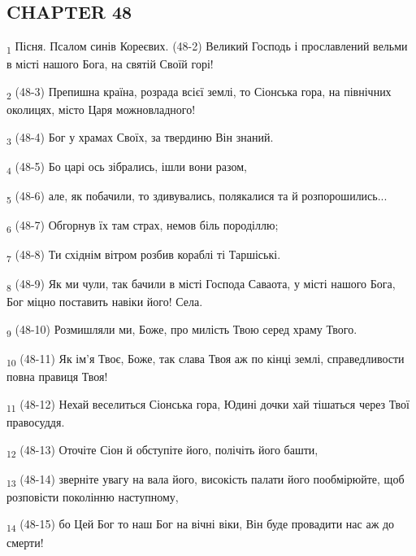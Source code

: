 \subsection{CHAPTER 48}
\begin{tcolorbox}
\textsubscript{1} Пісня. Псалом синів Кореєвих. (48-2) Великий Господь і прославлений вельми в місті нашого Бога, на святій Своїй горі!
\end{tcolorbox}
\begin{tcolorbox}
\textsubscript{2} (48-3) Препишна країна, розрада всієї землі, то Сіонська гора, на північних околицях, місто Царя можновладного!
\end{tcolorbox}
\begin{tcolorbox}
\textsubscript{3} (48-4) Бог у храмах Своїх, за твердиню Він знаний.
\end{tcolorbox}
\begin{tcolorbox}
\textsubscript{4} (48-5) Бо царі ось зібрались, ішли вони разом,
\end{tcolorbox}
\begin{tcolorbox}
\textsubscript{5} (48-6) але, як побачили, то здивувались, полякалися та й розпорошились...
\end{tcolorbox}
\begin{tcolorbox}
\textsubscript{6} (48-7) Обгорнув їх там страх, немов біль породіллю;
\end{tcolorbox}
\begin{tcolorbox}
\textsubscript{7} (48-8) Ти східнім вітром розбив кораблі ті Таршіські.
\end{tcolorbox}
\begin{tcolorbox}
\textsubscript{8} (48-9) Як ми чули, так бачили в місті Господа Саваота, у місті нашого Бога, Бог міцно поставить навіки його! Села.
\end{tcolorbox}
\begin{tcolorbox}
\textsubscript{9} (48-10) Розмишляли ми, Боже, про милість Твою серед храму Твого.
\end{tcolorbox}
\begin{tcolorbox}
\textsubscript{10} (48-11) Як ім'я Твоє, Боже, так слава Твоя аж по кінці землі, справедливости повна правиця Твоя!
\end{tcolorbox}
\begin{tcolorbox}
\textsubscript{11} (48-12) Нехай веселиться Сіонська гора, Юдині дочки хай тішаться через Твої правосуддя.
\end{tcolorbox}
\begin{tcolorbox}
\textsubscript{12} (48-13) Оточіте Сіон й обступіте його, полічіть його башти,
\end{tcolorbox}
\begin{tcolorbox}
\textsubscript{13} (48-14) зверніте увагу на вала його, високість палати його пообмірюйте, щоб розповісти поколінню наступному,
\end{tcolorbox}
\begin{tcolorbox}
\textsubscript{14} (48-15) бо Цей Бог то наш Бог на вічні віки, Він буде провадити нас аж до смерти!
\end{tcolorbox}
